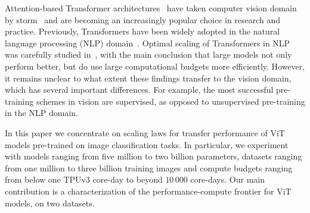 Attention-based Transformer architectures~\cite{vaswani2017attention} have taken computer vision domain by storm~\cite{dosovitskiy2020, carion2020endtoend} and are becoming an increasingly popular choice in research and practice.  Previously, Transformers have been widely adopted in the natural language processing (NLP) domain~\cite{devlin2019bert, brown2020language}.  Optimal scaling of Transformers in NLP was carefully studied in~\cite{kaplan2020scaling}, with the main conclusion that large models not only perform better, but do use large computational budgets more efficiently. However, it remains unclear to what extent these findings transfer to the vision domain, which has several important differences. For example, the most successful pre-training schemes in vision are supervised, as opposed to unsupervised pre-training in the NLP domain.

In this paper we concentrate on scaling laws for transfer performance of ViT models pre-trained on image classification tasks. In particular, we experiment with models ranging from five million to two billion parameters, datasets ranging from one million to three billion training images and compute budgets ranging from below one TPUv3 core-day to beyond $10\,000$ core-days. Our main contribution is a characterization of the performance-compute frontier for ViT models, on two datasets.


